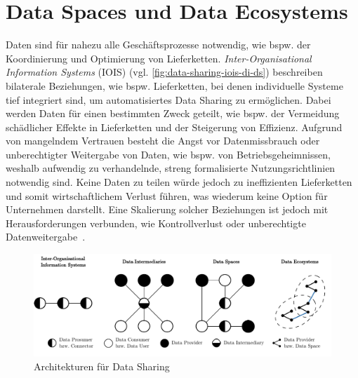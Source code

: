
\section{Data Spaces und Data Ecosystems}

Daten sind für nahezu alle Geschäftsprozesse notwendig, wie bspw. der Koordinierung und Optimierung von Lieferketten.
\emph{Inter-Organisational Information Systems} (IOIS) (vgl. \autoref{fig:data-sharing-iois-di-ds}) beschreiben bilaterale Beziehungen, wie bspw. Lieferketten, bei denen individuelle Systeme tief integriert sind, um automatisiertes Data Sharing zu ermöglichen.
Dabei werden Daten für einen bestimmten Zweck geteilt, wie bspw. der Vermeidung schädlicher Effekte in Lieferketten und der Steigerung von Effizienz.
Aufgrund von mangelndem Vertrauen besteht die Angst vor Datenmissbrauch oder unberechtigter Weitergabe von Daten, wie bspw. von Betriebsgeheimnissen, weshalb aufwendig zu verhandelnde, streng formalisierte Nutzungsrichtlinien notwendig sind.
Keine Daten zu teilen würde jedoch zu ineffizienten Lieferketten und somit wirtschaftlichem Verlust führen, was wiederum keine Option für Unternehmen darstellt.
Eine Skalierung solcher Beziehungen ist jedoch mit Herausforderungen verbunden, wie Kontrollverlust oder unberechtigte Datenweitergabe~\cite{mollerIndustrialDataEcosystems2024}.

\begin{figure}
    \includegraphics[width=\textwidth]{./assets/data_sharing_architectures.drawio.pdf}
    \caption{Architekturen für Data Sharing~\cite[vgl.][]{mollerIndustrialDataEcosystems2024}}
    \label{fig:data-sharing-iois-di-ds}
\end{figure}

